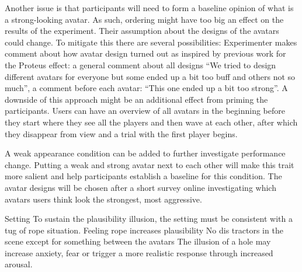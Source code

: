 Another issue is that participants will need to form a baseline opinion of what is a strong-looking avatar. As such, ordering might have too big an effect on the results of the experiment. Their assumption about the designs of the avatars could change. To mitigate this there are several possibilities:
Experimenter makes comment about how avatar design turned out as inspired by previous work for the Proteus effect: a general comment about all designs “We tried to design different avatars for everyone but some ended up a bit too buff and others not so much”, a comment before each avatar: “This one ended up a bit too strong”. A downside of this approach might be an additional effect from priming the participants.
Users can have an overview of all avatars in the beginning before they start where they see all the players and then wave at each other, after which they disappear from view and a trial with the first player begins. 

A weak appearance condition can be added to further investigate performance change. Putting a weak and strong avatar next to each other will make this trait more salient and help participants establish a baseline for this condition. The avatar designs will be chosen after a short survey online investigating which avatars users think look the strongest, most aggressive. 

Setting 
To sustain the plausibility illusion, the setting must be consistent with a tug of rope situation.
Feeling rope increases plausibility
No dis tractors in the scene except for something between the avatars
The illusion of a hole may increase anxiety, fear or trigger a more realistic response through increased arousal.

